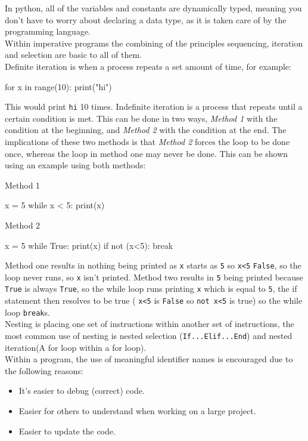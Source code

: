   In python, all of the variables and constants are dynamically typed, meaning you don't have to worry about declaring a data type, as it is taken care of by the programming language. \\
  Within imperative programs the combining of the principles sequencing, iteration and selection are basic to all of them.\\
  Definite iteration is when a process repeats a set amount of time, for example:
  \begin{python}
for x in range(10):
	print("hi")\end{python}
  This would print \verb|hi| 10 times. Indefinite iteration is a process that repeats until a certain condition is met. This can be done in two ways, \textit{Method 1} with the condition at the beginning, and \textit{Method 2} with the condition at the end. The implications of these two methods is that \textit{Method 2} forces the loop to be done once, whereas the loop in method one may never be done. This can be shown using an example using both methods:
  \begin{multicols}{2}
    Method 1
    \begin{python}
x = 5
while x < 5:
	print(x)\end{python}

    \columnbreak
    Method 2
    \begin{python}
x = 5
while True:
	print(x)
	if not (x<5):
		break \end{python}

  \end{multicols}
  \noindent
  Method one results in nothing being printed as \verb|x| starts as \verb|5| so \verb|x<5| \verb|False|, so the loop never runs, so \verb|x| isn't printed. Method two results in \verb|5| being printed because \verb|True| is always \verb|True|, so the while loop runs printing \verb|x| which is equal to \verb|5|, the if statement then resolves to be true ( \verb|x<5| is \verb|False| so \verb|not x<5| is true) so the while loop \verb|break|s.\\
  Nesting is placing one set of instructions within another set of instructions, the most common use of nesting is nested selection (\verb|If...Elif...End|) and nested iteration(A for loop within a for loop).\\
  Within a program, the use of meaningful identifier names is encouraged due to the following reasons:
  \begin{itemize}
    \setlength\itemsep{0em}
    \item It's easier to debug (correct) code.
    \item Easier for others to understand when working on a large project.
    \item Easier to update the code.
  \end{itemize}

